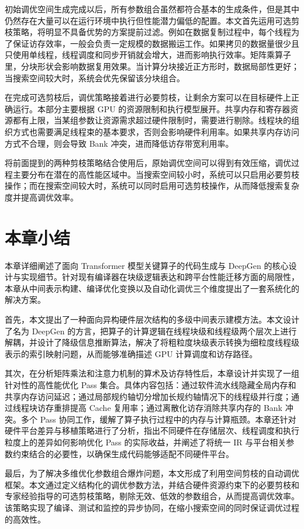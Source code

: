 初始调优空间生成完成以后，所有参数组合虽然都符合基本的生成条件，但是其中仍然存在大量可以在运行环境中执行但性能潜力偏低的配置。本文首先运用可选剪枝策略，将明显不具备优势的方案提前过滤。例如在数据复制过程中，每个线程为了保证访存效率，一般会负责一定规模的数据搬运工作。如果拷贝的数据量很少且只使用单线程，线程调度和同步开销就会增大，进而影响执行效率。矩阵乘算子里，分块形状会影响数据复用效果。当计算分块接近正方形时，数据局部性更好；当搜索空间较大时，系统会优先保留该分块组合。

在完成可选剪枝后，调优策略接着进行必要剪枝，让剩余方案可以在目标硬件上正确运行。本部分主要根据 GPU 的资源限制和执行模型展开。共享内存和寄存器资源都有上限，当某组参数让资源需求超过硬件限制时，需要进行剔除。线程块的组织方式也需要满足线程束的基本要求，否则会影响硬件利用率。如果共享内存访问方式不合理，则会导致 Bank 冲突，进而降低访存带宽利用率。

将前面提到的两种剪枝策略结合使用后，原始调优空间可以得到有效压缩，调优过程主要分布在潜在的高性能区域中。当搜索空间较小时，系统可以只启用必要剪枝操作；而在搜索空间较大时，系统可以同时启用可选剪枝操作，从而降低搜索复杂度并提高调优效率。

\section{本章小结}
本章详细阐述了面向 Transformer 模型关键算子的代码生成与 DeepGen 的核心设计与实现细节。针对现有编译器在块级逻辑表达和跨平台性能迁移方面的局限性，本章从中间表示构建、编译优化变换以及自动化调优三个维度提出了一套系统化的解决方案。

首先，本文提出了一种面向异构硬件层次结构的多级中间表示建模方法。本文设计了名为 DeepGen 的方言，把算子的计算逻辑在线程块级和线程级两个层次上进行解耦，并设计了降级信息推断算法，解决了将粗粒度块级表示转换为细粒度线程级表示的索引映射问题，从而能够准确描述 GPU 计算调度和访存路径。

其次，在分析矩阵乘法和注意力机制的算术及访存特性后，本章设计并实现了一组针对性的高性能优化 Pass 集合。具体内容包括：通过软件流水线隐藏全局内存和共享内存访问延迟；通过局部规约轴切分增加长规约轴情况下的线程级并行度；通过线程块访存重排提高 Cache 复用率；通过离散化访存消除共享内存的 Bank 冲突。多个 Pass 协同工作，缓解了算子执行过程中的内存与计算瓶颈。本章还针对硬件平台差异与移植策略进行了分析，指出不同硬件在存储层次、线程调度和执行粒度上的差异如何影响优化 Pass 的实际收益，并阐述了将统一 IR 与平台相关参数约束结合的必要性，以确保生成代码能够适配不同硬件平台。

最后，为了解决多维优化参数组合爆炸问题，本文形成了利用空间剪枝的自动调优框架。本文通过定义结构化的调优参数方法，并结合硬件资源约束下的必要剪枝和专家经验指导的可选剪枝策略，剔除无效、低效的参数组合，从而提高调优效率。该策略实现了编译、测试和监控的异步协同，在缩小搜索空间的同时保证调优过程的高效性。

